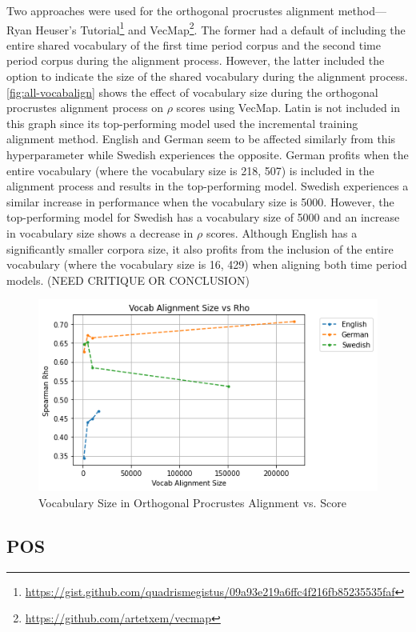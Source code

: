Two approaches were used for the orthogonal procrustes alignment method—Ryan Heuser’s Tutorial\footnote{\url{https://gist.github.com/quadrismegistus/09a93e219a6ffc4f216fb85235535faf}} and VecMap\footnote{\url{https://github.com/artetxem/vecmap}}. The former had a default of including the entire shared vocabulary of the first time period corpus and the second time period corpus during the alignment process. However, the latter included the option to indicate the size of the shared vocabulary during the alignment process. \autoref{fig:all-vocabalign} shows the effect of vocabulary size during the orthogonal procrustes alignment process on $\rho$ scores using VecMap. Latin is not included in this graph since its top-performing model used the incremental training alignment method. English and German seem to be affected similarly from this hyperparameter while Swedish experiences the opposite. German profits when the entire vocabulary (where the vocabulary size is 218, 507) is included in the alignment process and results in the top-performing model. Swedish experiences a similar increase in performance when the vocabulary size is 5000. However, the top-performing model for Swedish has a vocabulary size of 5000 and an increase in vocabulary size shows a decrease in $\rho$ scores. Although English has a significantly smaller corpora size, it also profits from the inclusion of the entire vocabulary (where the vocabulary size is 16, 429) when aligning both time period models. (NEED CRITIQUE OR CONCLUSION)

\begin{figure}[h]
  \centering
  \includegraphics[width=.8\linewidth]{sections/figures/vocabalignment_all.png}
  \caption{Vocabulary Size in Orthogonal Procrustes Alignment vs. Score}
  \label{fig:all-vocabalign}
\end{figure}

\subsection{POS}

